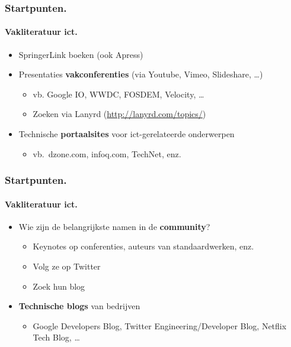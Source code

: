 \documentclass[aspectratio=169]{beamer}
\begin{document}
\begin{frame}
  \frametitle{Startpunten.}
  \framesubtitle{Vakliteratuur ict.}

  \begin{itemize}
    \item SpringerLink boeken (ook Apress)
    \item Presentaties \textbf{vakconferenties} (via Youtube, Vimeo, Slideshare, \dots)
          \begin{itemize}
            \item vb. Google IO, WWDC, FOSDEM, Velocity, \dots
            \item Zoeken via Lanyrd (\url{http://lanyrd.com/topics/})
          \end{itemize}
    \item<+-> Technische \textbf{portaalsites} voor ict-gerelateerde onderwerpen
      \begin{itemize}
        \item vb.~dzone.com, infoq.com, TechNet, enz.
      \end{itemize}
  \end{itemize}
\end{frame}

\begin{frame}
  \frametitle{Startpunten.}
  \framesubtitle{Vakliteratuur ict.}

  \begin{itemize}
    \item<+-> Wie zijn de belangrijkste namen in de \textbf{community}?
      \begin{itemize}
        \item Keynotes op conferenties, auteurs van standaardwerken, enz.
        \item Volg ze op Twitter
        \item Zoek hun blog
      \end{itemize}
    \item<+-> \textbf{Technische blogs} van bedrijven
      \begin{itemize}
        \item Google Developers Blog, Twitter Engineering/Developer Blog, Netflix Tech Blog, \dots
      \end{itemize}
  \end{itemize}
\end{frame}
\end{document}
